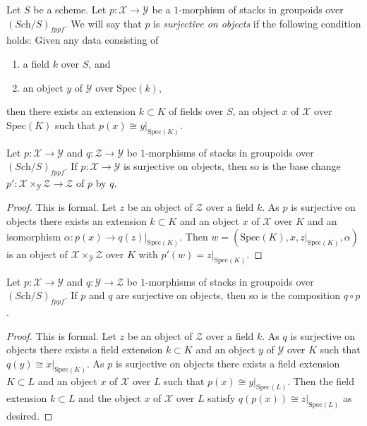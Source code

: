 \noindent
Let $S$ be a scheme. Let $p : \mathcal{X} \to \mathcal{Y}$ be a $1$-morphism
of stacks in groupoids over $(\textit{Sch}/S)_{fppf}$. We will say that
$p$ is {\it surjective on objects} if the following condition holds:
Given any data consisting of
\begin{enumerate}
\item a field $k$ over $S$, and
\item an object $y$ of $\mathcal{Y}$ over $\text{Spec}(k)$,
\end{enumerate}
then there exists an extension $k \subset K$ of fields over $S$, an
object $x$ of $\mathcal{X}$ over $\text{Spec}(K)$
such that $p(x) \cong y|_{\text{Spec}(K)}$.

\begin{lemma}
\label{lemma-base-change-surjective}
Let $p : \mathcal{X} \to \mathcal{Y}$ and $q : \mathcal{Z} \to \mathcal{Y}$
be $1$-morphisms of stacks in groupoids over $(\textit{Sch}/S)_{fppf}$.
If $p : \mathcal{X} \to \mathcal{Y}$ is surjective on objects, then so
is the base change
$p' : \mathcal{X} \times_{\mathcal{Y}} \mathcal{Z} \to \mathcal{Z}$
of $p$ by $q$.
\end{lemma}

\begin{proof}
This is formal. Let $z$ be an object of $\mathcal{Z}$ over a field $k$.
As $p$ is surjective on objects there exists an extension $k \subset K$
and an object $x$ of $\mathcal{X}$ over $K$ and an isomorphism
$\alpha : p(x) \to q(z)|_{\text{Spec}(K)}$. Then
$w = (\text{Spec}(K), x, z|_{\text{Spec}(K)}, \alpha)$ is an object of
$\mathcal{X} \times_{\mathcal{Y}} \mathcal{Z}$ over $K$ with
$p'(w) = z|_{\text{Spec}(K)}$.
\end{proof}

\begin{lemma}
\label{lemma-composition-surjective}
Let $p : \mathcal{X} \to \mathcal{Y}$ and $q : \mathcal{Y} \to \mathcal{Z}$
be $1$-morphisms of stacks in groupoids over $(\textit{Sch}/S)_{fppf}$.
If $p$ and $q$ are surjective on objects, then so is the composition
$q \circ p$.
\end{lemma}

\begin{proof}
This is formal. Let $z$ be an object of $\mathcal{Z}$ over a field $k$.
As $q$ is surjective on objects there exists a field extension $k \subset K$
and an object $y$ of $\mathcal{Y}$ over $K$ such that
$q(y) \cong x|_{\text{Spec}(K)}$. As $p$ is surjective on objects there
exists a field extension $K \subset L$ and an object $x$ of $\mathcal{X}$
over $L$ such that $p(x) \cong y|_{\text{Spec}(L)}$. Then the field extension
$k \subset L$ and the object $x$ of $\mathcal{X}$ over $L$ satisfy
$q(p(x)) \cong z|_{\text{Spec}(L)}$ as desired.
\end{proof}


